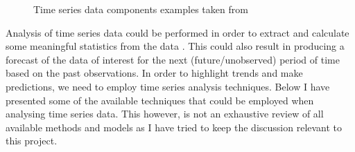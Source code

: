 \begin{figure}[ht]
	\caption{Time series data components examples taken from \cite{wildchance}}%
	\label{fig:timeSeriesDataComponents}
\end{figure}

Analysis of time series data could be performed in order to extract and calculate some meaningful statistics from the data \cite{shumway2010time}. This could also result in producing a forecast of the data of interest for the next (future/unobserved) period of time based on the past observations. In order to highlight trends and make predictions, we need to employ time series analysis techniques. Below I have presented some of the available techniques that could be employed when analysing time series data. This however, is not an exhaustive review of all available methods and models as I have tried to keep the discussion relevant to this project.



